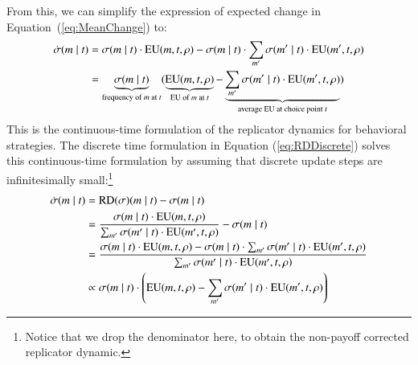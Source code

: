 \documentclass[fleqn,reqno,10pt]{article}
\newcommand{\RD}{\ensuremath{\mathrm{RD}}} %
\begin{document}
From this, we can simplify the expression of expected change in Equation~(\ref{eq:MeanChange})
to:
\begin{align*}
  \dot{\sigma}(m \mid t) & = \sigma(m \mid t) \cdot \mathrm{EU}(m,
  t, \rho) - \sigma(m \mid t) \cdot  \sum_{m'}
      \sigma(m' \mid t) \cdot \mathrm{EU}(m',t,\rho) \\
& = \underbrace{\sigma(m \mid t)}_{\text{frequency of $m$ at $t$}}  ( \underbrace{\mathrm{EU}(m,
  t, \rho)}_{\text{EU of $m$ at $t$}} -   \underbrace{\sum_{m'}
      \sigma(m' \mid t) \cdot \mathrm{EU}(m',t,\rho)}_{\text{average
      EU at choice point $t$}}  ) 
\end{align*}
This is the continuous-time formulation of the replicator dynamics for behavioral
strategies. The discrete time formulation in Equation (\ref{eq:RDDiscrete}) solves this
continuous-time formulation by assuming that discrete update steps are infinitesimally
small:\footnote{Notice that we drop the denominator here, to obtain the non-payoff corrected
  replicator dynamic.}
\begin{align*}
  \dot{\Sstrat}(\messg \probbar \state) & = \RD(\Sstrat)(\messg \probbar \state) -
  \Sstrat(\messg \probbar \state) \\
  & = \frac{\Sstrat(\messg \probbar \state) \cdot \EU(\messg, \state,\Rstrat)} {\sum_{\messg'}
    \Sstrat(\messg' \probbar \state) \cdot
    \EU(\messg', \state,\Rstrat)} - \Sstrat(\messg \probbar \state) \\
  & = \frac{\Sstrat(\messg \probbar \state) \cdot \EU(\messg, \state,\Rstrat) - \Sstrat(\messg
    \probbar \state) \cdot \sum_{\messg'} \Sstrat(\messg' \probbar \state) \cdot \EU(\messg',
    \state,\Rstrat)} {\sum_{\messg'} \Sstrat(\messg' \probbar \state) \cdot
    \EU(\messg', \state,\Rstrat)}  \\
  & \propto \Sstrat(\messg \probbar \state) \cdot \left ( \EU(\messg, \state,\Rstrat) - \sum_{\messg'} \Sstrat(\messg' \probbar \state) \cdot \EU(\messg',
  \state,\Rstrat) \right )
\end{align*}



\bigskip
\end{document}
